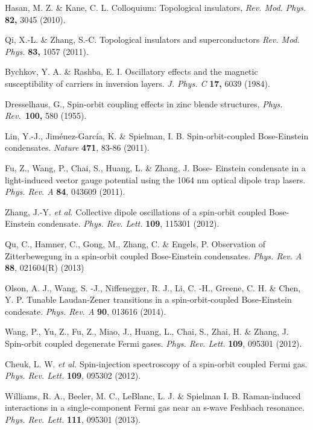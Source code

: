 \documentclass[aps,prl,twocolumn,floatfix,reprint]{revtex4}
\begin{document}
\begin{thebibliography}{99}
 Hasan, M. Z. \& Kane, C. L. Colloquium: Topological
insulators, \textit{Rev. Mod. Phys.} \textbf{82,} 3045 (2010).

 Qi, X.-L. \& Zhang, S.-C. Topological insulators and
superconductors \textit{Rev. Mod. Phys.} \textbf{83,} 1057 (2011).

 Bychkov, Y. A. \& Rashba, E. I. Oscillatory effects and the
magnetic susceptibility of carriers in inversion layers. \textit{J. Phys. C}
\textbf{17,} 6039 (1984).

 Dresselhaus, G., Spin-orbit coupling effects in
zinc blende structures, \emph{Phys. Rev.}~\textbf{100,} 580 (1955).

 Lin, Y.-J., Jim\'enez-Garc\'ia, K. \& Spielman, I. B.
Spin-orbit-coupled Bose-Einstein condensates. \emph{Nature} \textbf{471},
83-86 (2011).

 Fu, Z., Wang, P., Chai, S., Huang, L. \& Zhang, J. Bose-
Einstein condensate in a light-induced vector gauge potential using the 1064
nm optical dipole trap lasers. \emph{Phys. Rev. A} \textbf{84}, 043609
(2011).

 Zhang, J.-Y. \emph{et al.} Collective dipole
oscillations of a spin-orbit coupled Bose-Einstein condensate. \emph{Phys.
Rev. Lett.} \textbf{109}, 115301 (2012).

 Qu, C., Hamner, C., Gong, M., Zhang, C. \& Engels,
P. Observation of Zitterbewegung in a spin-orbit coupled Bose-Einstein
condensates. \emph{Phys. Rev. A} \textbf{88}, 021604(R) (2013)

 Olson, A. J., Wang, S. -J., Niffenegger, R. J., Li, C. -H.,
Greene, C. H. \& Chen, Y. P. Tunable Laudan-Zener transitions in a
spin-orbit-coupled Bose-Einstein condesate. \emph{Phys. Rev. A} \textbf{90},
013616 (2014).

 Wang, P., Yu, Z., Fu, Z., Miao, J., Huang, L., Chai, S.,
Zhai, H. \& Zhang, J. Spin-orbit coupled degenerate Fermi gases. \emph{Phys.
Rev. Lett.} \textbf{109}, 095301 (2012).

 Cheuk, L. W. \emph{et al.} Spin-injection spectroscopy of a
spin-orbit coupled Fermi gas. \emph{Phys. Rev. Lett.} \textbf{109}, 095302
(2012).

 Williams, R. A., Beeler, M. C., LeBlanc, L. J. \&
Spielman I. B. Raman-induced interactions in a single-component Fermi gas
near an s-wave Feshbach resonance. \emph{Phys. Rev. Lett.} \textbf{111},
095301 (2013).


\end{thebibliography}
\end{document}
